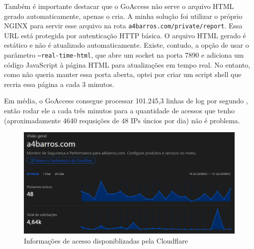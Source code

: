 Também é importante destacar que o GoAccess não serve o arquivo HTML gerado automaticamente, apenas 
o cria. A minha solução foi utilizar o próprio NGINX para servir esse arquivo na rota \texttt{a4barros.com/private/report}. 
Essa URL está protegida por autenticação HTTP básica. O arquivo HTML gerado é estático e não é 
atualizado automaticamente. Existe, contudo, a opção de usar o parâmetro \texttt{--real-time-html}, 
que abre um socket na porta 7890 e adiciona um código JavaScript à página HTML para atualizações em 
tempo real. No entanto, como não queria manter essa porta aberta, optei por criar um script shell 
que recria essa página a cada 3 minutos.



Em média, o GoAccess consegue processar 101.245,3 linhas de log por segundo \cite{goaccess-speed},
então rodar ele a cada três minutos para a quantidade de acessos que tenho (aproximadamente 4640 requsições
de 48 IPs úncios por dia) não é problema.

\begin{figure}[ht]
    \begin{center}
    \includegraphics[width=400pt]{img/cloudflare-stat.png}
    \caption{Informações de acesso disponiblizadas pela Cloudflare}
    \label{fig:cloudflare-stat.png}
    \end{center}
\end{figure}